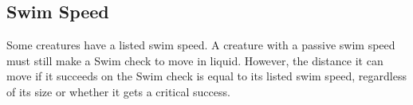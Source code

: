    \subsection{Swim Speed}\label{Swim Speed}
        Some creatures have a listed swim speed.
        A creature with a passive swim speed must still make a Swim check to move in liquid.
        However, the distance it can move if it succeeds on the Swim check is equal to its listed swim speed, regardless of its size or whether it gets a critical success.
